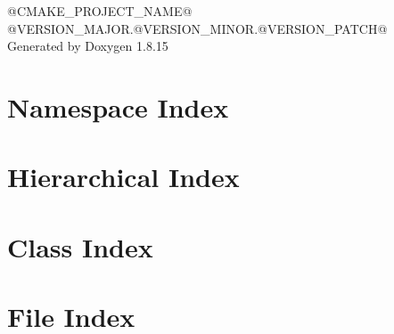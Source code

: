 \let\mypdfximage\pdfximage\def\pdfximage{\immediate\mypdfximage}\documentclass[twoside]{book}
\newcommand{\+}{\discretionary{\mbox{\scriptsize$\hookleftarrow$}}{}{}}
\newcommand{\clearemptydoublepage}{%
  \newpage{\pagestyle{empty}\cleardoublepage}%
}
\begin{document}
\hypersetup{pageanchor=false,
             bookmarksnumbered=true,
             pdfencoding=unicode
            }
\begin{titlepage}
\vspace*{7cm}
\begin{center}%
{\Large @C\+M\+A\+K\+E\+\_\+\+P\+R\+O\+J\+E\+C\+T\+\_\+\+N\+A\+ME@ \\[1ex]\large @\+V\+E\+R\+S\+I\+O\+N\+\_\+\+M\+A\+J\+OR.@\+V\+E\+R\+S\+I\+O\+N\+\_\+\+M\+I\+N\+OR.@\+V\+E\+R\+S\+I\+O\+N\+\_\+\+P\+A\+T\+CH@ }\\
\vspace*{1cm}
{\large Generated by Doxygen 1.8.15}\\
\end{center}
\end{titlepage}
\clearemptydoublepage
{}
\tableofcontents
\clearemptydoublepage
{}
\hypersetup{pageanchor=true}

\chapter{Namespace Index}

\chapter{Hierarchical Index}

\chapter{Class Index}

\chapter{File Index}

\end{document}
